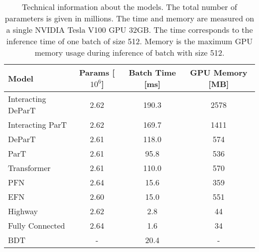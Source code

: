 \begin{table}[!htb]
    \centering
    \caption{Technical information about the models. The total number of parameters is given in millions. The time and memory are measured on a single NVIDIA Tesla V100 GPU 32GB. The time corresponds to the inference time of one batch of size 512. Memory is the maximum GPU memory usage during inference of batch with size 512.}
    \label{tab:tech}
    \begin{tabular}{lccc}
    \toprule
        Model & Params [$10^{6}$] & Batch Time [ms] & GPU Memory [MB] \\
    \midrule
        Interacting DeParT &  2.62 & 190.3 & 2578 \\
        Interacting ParT & 2.62 & 169.7 & 1411 \\
        DeParT &  2.61 & 118.0 & 574 \\
        ParT & 2.61 & 95.8 & 536 \\
        Transformer & 2.61 & 110.0 & 570 \\
        PFN & 2.64 & 15.6 & 359 \\
        EFN & 2.60 & 15.0 & 551 \\
        Highway & 2.62 & 2.8 & 44 \\
        Fully Connected & 2.64 & 1.6 & 34 \\
        BDT &  - & 20.4 & - \\
    \bottomrule
    \end{tabular}
\end{table}
    